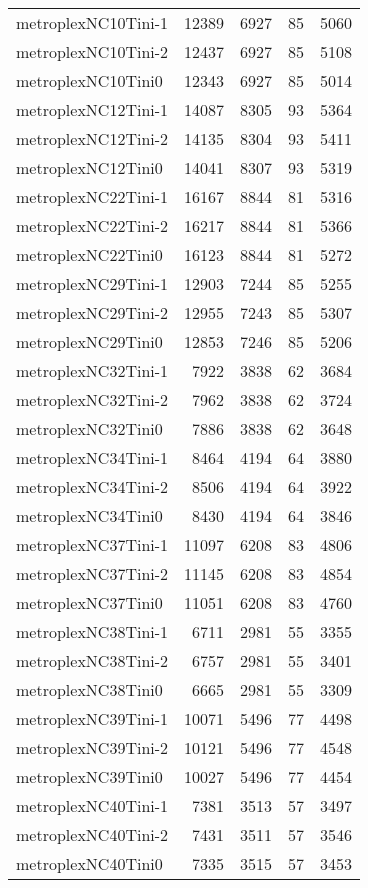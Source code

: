 \begin{longtable}{lrrrr}
metroplexNC10Tini-1 & 12389 & 6927 & 85 & 5060 \\
metroplexNC10Tini-2 & 12437 & 6927 & 85 & 5108 \\
metroplexNC10Tini0 & 12343 & 6927 & 85 & 5014 \\
metroplexNC12Tini-1 & 14087 & 8305 & 93 & 5364 \\
metroplexNC12Tini-2 & 14135 & 8304 & 93 & 5411 \\
metroplexNC12Tini0 & 14041 & 8307 & 93 & 5319 \\
metroplexNC22Tini-1 & 16167 & 8844 & 81 & 5316 \\
metroplexNC22Tini-2 & 16217 & 8844 & 81 & 5366 \\
metroplexNC22Tini0 & 16123 & 8844 & 81 & 5272 \\
metroplexNC29Tini-1 & 12903 & 7244 & 85 & 5255 \\
metroplexNC29Tini-2 & 12955 & 7243 & 85 & 5307 \\
metroplexNC29Tini0 & 12853 & 7246 & 85 & 5206 \\
metroplexNC32Tini-1 & 7922 & 3838 & 62 & 3684 \\
metroplexNC32Tini-2 & 7962 & 3838 & 62 & 3724 \\
metroplexNC32Tini0 & 7886 & 3838 & 62 & 3648 \\
metroplexNC34Tini-1 & 8464 & 4194 & 64 & 3880 \\
metroplexNC34Tini-2 & 8506 & 4194 & 64 & 3922 \\
metroplexNC34Tini0 & 8430 & 4194 & 64 & 3846 \\
metroplexNC37Tini-1 & 11097 & 6208 & 83 & 4806 \\
metroplexNC37Tini-2 & 11145 & 6208 & 83 & 4854 \\
metroplexNC37Tini0 & 11051 & 6208 & 83 & 4760 \\
metroplexNC38Tini-1 & 6711 & 2981 & 55 & 3355 \\
metroplexNC38Tini-2 & 6757 & 2981 & 55 & 3401 \\
metroplexNC38Tini0 & 6665 & 2981 & 55 & 3309 \\
metroplexNC39Tini-1 & 10071 & 5496 & 77 & 4498 \\
metroplexNC39Tini-2 & 10121 & 5496 & 77 & 4548 \\
metroplexNC39Tini0 & 10027 & 5496 & 77 & 4454 \\
metroplexNC40Tini-1 & 7381 & 3513 & 57 & 3497 \\
metroplexNC40Tini-2 & 7431 & 3511 & 57 & 3546 \\
metroplexNC40Tini0 & 7335 & 3515 & 57 & 3453 \\

\end{longtable}
